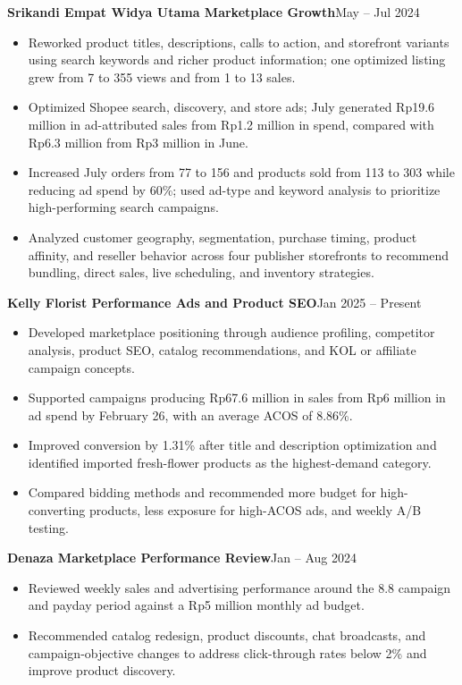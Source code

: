 
\textbf{Srikandi Empat Widya Utama Marketplace Growth}\hfill {\color{SecondaryText}\small May -- Jul 2024}\par
\begin{itemize}
  \item Reworked product titles, descriptions, calls to action, and storefront variants using search keywords and richer product information; one optimized listing grew from 7 to 355 views and from 1 to 13 sales.
  \item Optimized Shopee search, discovery, and store ads; July generated Rp19.6 million in ad-attributed sales from Rp1.2 million in spend, compared with Rp6.3 million from Rp3 million in June.
  \item Increased July orders from 77 to 156 and products sold from 113 to 303 while reducing ad spend by 60\%; used ad-type and keyword analysis to prioritize high-performing search campaigns.
  \item Analyzed customer geography, segmentation, purchase timing, product affinity, and reseller behavior across four publisher storefronts to recommend bundling, direct sales, live scheduling, and inventory strategies.
\end{itemize}

\textbf{Kelly Florist Performance Ads and Product SEO}\hfill {\color{SecondaryText}\small Jan 2025 -- Present}\par
\begin{itemize}
  \item Developed marketplace positioning through audience profiling, competitor analysis, product SEO, catalog recommendations, and KOL or affiliate campaign concepts.
  \item Supported campaigns producing Rp67.6 million in sales from Rp6 million in ad spend by February 26, with an average ACOS of 8.86\%.
  \item Improved conversion by 1.31\% after title and description optimization and identified imported fresh-flower products as the highest-demand category.
  \item Compared bidding methods and recommended more budget for high-converting products, less exposure for high-ACOS ads, and weekly A/B testing.
\end{itemize}

\textbf{Denaza Marketplace Performance Review}\hfill {\color{SecondaryText}\small Jan -- Aug 2024}\par
\begin{itemize}
  \item Reviewed weekly sales and advertising performance around the 8.8 campaign and payday period against a Rp5 million monthly ad budget.
  \item Recommended catalog redesign, product discounts, chat broadcasts, and campaign-objective changes to address click-through rates below 2\% and improve product discovery.
\end{itemize}

